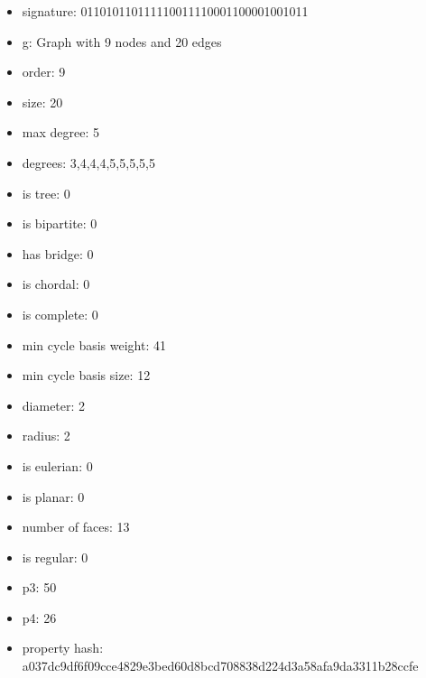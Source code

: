 \newpage
\begin{figure}
\end{figure}
\begin{itemize}
\item signature: 011010110111110011110001100001001011
\item g: Graph with 9 nodes and 20 edges
\item order: 9
\item size: 20
\item max degree: 5
\item degrees: 3,4,4,4,5,5,5,5,5
\item is tree: 0
\item is bipartite: 0
\item has bridge: 0
\item is chordal: 0
\item is complete: 0
\item min cycle basis weight: 41
\item min cycle basis size: 12
\item diameter: 2
\item radius: 2
\item is eulerian: 0
\item is planar: 0
\item number of faces: 13
\item is regular: 0
\item p3: 50
\item p4: 26
\item property hash: a037dc9df6f09cce4829e3bed60d8bcd708838d224d3a58afa9da3311b28ccfe
\end{itemize}
